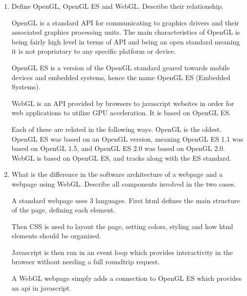 \documentclass{article}
\begin{document}
    \begin{enumerate}
        \item Define OpenGL, OpenGL ES and WebGL. Describe their relationship.
            \begin{mdframed}
                OpenGL is a standard API for communicating to graphics
                drivers and their associated graphics processing units.
                The main characteristics of OpenGL is being fairly high level
                in terms of API and being an open standard meaning it is not
                propriatary to any specific platform or device.

                OpenGL ES is a version of the OpenGL standard geared towards
                mobile devices and embedded systems, hence the name
                OpenGL ES (Embedded Systems).

                WebGL is an API provided by browsers to javascript websites
                in order for web applications to utilize GPU acceleration.
                It is based on OpenGL ES.

                Each of these are related in the following ways. OpenGL is
                the oldest. OpenGL ES was based on an OpenGL version,
                meaning OpenGL ES 1.1 was based on OpenGL 1.5, and OpenGL ES
                2.0 was based on OpenGL 2.0. WebGL is based on OpenGL ES,
                and tracks along with the ES standard.
            \end{mdframed} 
        \item What is the difference in the software architecture of a webpage and a webpage using WebGL.
            Describe all components involved in the two cases.
            \begin{mdframed}
                A standard webpage uses 3 languages. First html
                defines the main structure of the page, defining
                each element.

                Then CSS is used to layout the page, setting colors,
                styling and how html elements should be organized.

                Javascript is then run in an event loop which provides
                interactivity in the browser without needing a full
                roundtrip request.

                A WebGL webpage simply adds a connection to OpenGL ES
                which provides an api in javascript.


\end{mdframed}
\end{enumerate}
\end{document}
